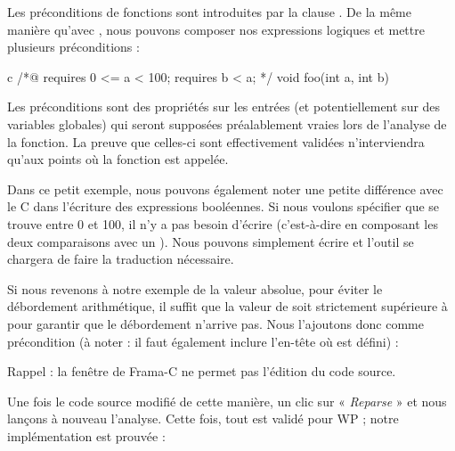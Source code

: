 Les préconditions de fonctions sont introduites par la clause .
De la même manière qu'avec , nous pouvons composer nos
expressions logiques et mettre plusieurs préconditions :



\begin{CodeBlock}{c}
/*@
  requires 0 <= a < 100;
  requires b < a;
*/
void foo(int a, int b){

}
\end{CodeBlock}



Les préconditions sont des propriétés sur les entrées (et potentiellement sur
des variables globales) qui seront supposées préalablement vraies lors de
l'analyse de la fonction. La preuve que celles-ci sont effectivement validées
n'interviendra qu'aux points où la fonction est appelée.



Dans ce petit exemple, nous pouvons également noter une petite différence avec
le C dans l'écriture des expressions booléennes. Si nous voulons spécifier
que  se trouve entre 0 et 100, il n'y a pas besoin d'écrire 
(c'est-à-dire en composant les deux comparaisons avec un \CodeInline{\&\&}). Nous
pouvons simplement écrire  et l'outil se chargera de faire
la traduction nécessaire.



Si nous revenons à notre exemple de la valeur absolue, pour éviter le
débordement arithmétique, il suffit que la valeur de  soit
strictement  supérieure à  pour garantir que le
débordement n'arrive pas.
Nous l'ajoutons donc comme précondition (à noter : il faut également
inclure l'en-tête où  est défini) :






\begin{Warning}
Rappel : la fenêtre de Frama-C ne permet pas l'édition du code source.
\end{Warning}


Une fois le code source modifié de cette manière, un clic sur « \textit{Reparse} » et
nous lançons à nouveau l'analyse. Cette fois, tout est validé pour WP ; notre
implémentation est prouvée :





